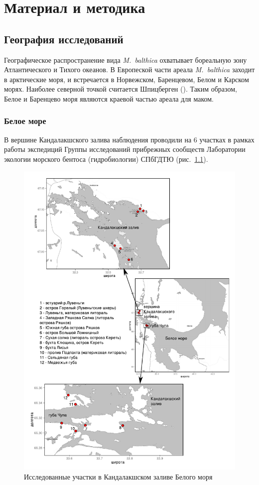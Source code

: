 \chapter{Материал и методика}
	\section{География исследований}
Географическое распространение вида {\it M.~balthica} охватывает бореальную зону Атлантического и Тихого океанов.
В Европеской части ареала {\it M.~balthica} заходит в арктические моря, и встречается в Норвежском, Баренцевом, Белом и Карском морях.
Наиболее северной точкой считается Шпицберген (\cite{Zacepin_Filatova_1968}).
Таким образом, Белое и Баренцево моря являются краевой частью ареала для маком.
		\subsection{Белое море}
В вершине Кандалакшского залива наблюдения проводили на $6$ участках в рамках работы экспедиций Группы исследований прибрежных сообществ Лаборатории экологии морского бентоса (гидробиологии) СПбГДТЮ (рис.~\ref{ris:karta_White}). 
	\begin{figure}[p]
    \includegraphics[width=\textwidth]{../maps/White_sea1.pdf}
    \caption{Исследованные участки в Кандалакшском заливе Белого моря}
    \label{ris:karta_White}
	\end{figure}
